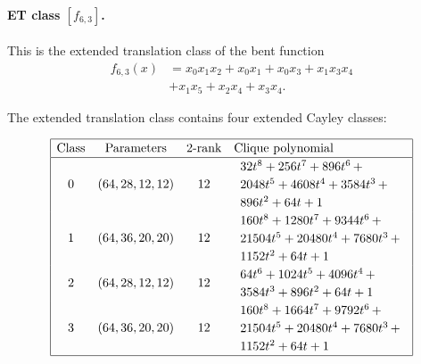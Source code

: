 \documentclass[12pt,a4paper]{article}
\begin{document}
%
\paragraph*{ET class $[f_{6,3}]$.}
%
This is the extended translation class of the bent function
\begin{align*}
f_{6,3}(x) &= x_{0} x_{1} x_{2} + x_{0} x_{1} + x_{0} x_{3} + x_{1} x_{3} x_{4}
\\
           &+ x_{1} x_{5} + x_{2} x_{4} + x_{3} x_{4}.
\end{align*}

The extended translation class contains
four extended Cayley classes:

\begin{table}[!bhpt] %
\small{}
\begin{align*}
\def\arraystretch{1.2}
\begin{array}{|cccl|}
\hline
\text{Class} &
\text{Parameters} &
\text{2-rank} &
\text{Clique polynomial}
\\
\hline
0 &
(64, 28, 12, 12) &
12 &
\begin{array}{l}
32t^{8} + 256t^{7} + 896t^{6}
\,+
\\
 2048t^{5} + 4608t^{4} + 3584t^{3}
\,+
\\
 896t^{2} + 64t + 1
\end{array}
\\
1 &
(64, 36, 20, 20) &
12 &
\begin{array}{l}
160t^{8} + 1280t^{7} + 9344t^{6}
\,+
\\
 21504t^{5} + 20480t^{4} + 7680t^{3}
\,+
\\
 1152t^{2} + 64t + 1
\end{array}
\\
2 &
(64, 28, 12, 12) &
12 &
\begin{array}{l}
64t^{6} + 1024t^{5} + 4096t^{4}
\,+
\\
 3584t^{3} + 896t^{2} + 64t + 1
\end{array}
\\
3 &
(64, 36, 20, 20) &
12 &
\begin{array}{l}
160t^{8} + 1664t^{7} + 9792t^{6}
\,+
\\
 21504t^{5} + 20480t^{4} + 7680t^{3}
\,+
\\
 1152t^{2} + 64t + 1
\end{array}
\\
\hline
\end{array}
\end{align*}
\caption{$f_{6,3}$ extended Cayley classes}
\label{tab-c6_3_EC_classes}
\end{table}
\end{document}

